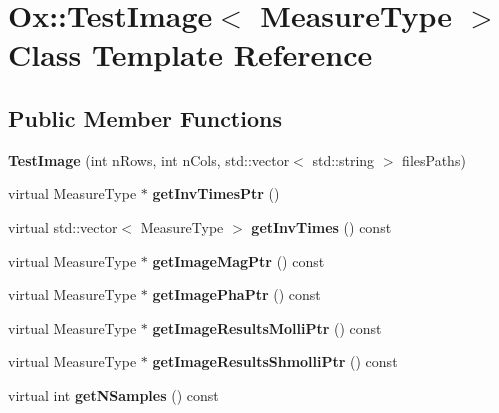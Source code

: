 \hypertarget{class_ox_1_1_test_image}{\section{Ox\-:\-:Test\-Image$<$ Measure\-Type $>$ Class Template Reference}
\label{class_ox_1_1_test_image}
}
\subsection*{Public Member Functions}
\begin{DoxyCompactItemize}
\item 
\hypertarget{class_ox_1_1_test_image_ae85558a95e4be798c58a384ac50904df}{{\bfseries Test\-Image} (int n\-Rows, int n\-Cols, std\-::vector$<$ std\-::string $>$ files\-Paths)}\label{class_ox_1_1_test_image_ae85558a95e4be798c58a384ac50904df}

\item 
\hypertarget{class_ox_1_1_test_image_a6dda2e0b1c2f9d285a29007a14441be3}{virtual Measure\-Type $\ast$ {\bfseries get\-Inv\-Times\-Ptr} ()}\label{class_ox_1_1_test_image_a6dda2e0b1c2f9d285a29007a14441be3}

\item 
\hypertarget{class_ox_1_1_test_image_accd975ba34db53a323810f506e0953d1}{virtual std\-::vector$<$ Measure\-Type $>$ {\bfseries get\-Inv\-Times} () const }\label{class_ox_1_1_test_image_accd975ba34db53a323810f506e0953d1}

\item 
\hypertarget{class_ox_1_1_test_image_a825435d601877f1595b5b04d8f2df2c1}{virtual Measure\-Type $\ast$ {\bfseries get\-Image\-Mag\-Ptr} () const }\label{class_ox_1_1_test_image_a825435d601877f1595b5b04d8f2df2c1}

\item 
\hypertarget{class_ox_1_1_test_image_a6e7c4c1195dfd0c1938c913b230b48a7}{virtual Measure\-Type $\ast$ {\bfseries get\-Image\-Pha\-Ptr} () const }\label{class_ox_1_1_test_image_a6e7c4c1195dfd0c1938c913b230b48a7}

\item 
\hypertarget{class_ox_1_1_test_image_a9da80782972a99cae274cde3de03bbda}{virtual Measure\-Type $\ast$ {\bfseries get\-Image\-Results\-Molli\-Ptr} () const }\label{class_ox_1_1_test_image_a9da80782972a99cae274cde3de03bbda}

\item 
\hypertarget{class_ox_1_1_test_image_aef09efd3eb4b1a37d3b6b479d1e4a016}{virtual Measure\-Type $\ast$ {\bfseries get\-Image\-Results\-Shmolli\-Ptr} () const }\label{class_ox_1_1_test_image_aef09efd3eb4b1a37d3b6b479d1e4a016}

\item 
\hypertarget{class_ox_1_1_test_image_a87559c865b1f365c0bd7cfc9c5939d2b}{virtual int {\bfseries get\-N\-Samples} () const }\label{class_ox_1_1_test_image_a87559c865b1f365c0bd7cfc9c5939d2b}

\end{DoxyCompactItemize}
